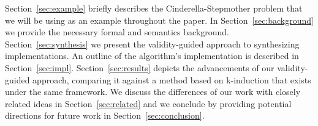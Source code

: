 Section~\ref{sec:example} briefly describes the Cinderella-Stepmother problem that we will be using as an example throughout the paper. In Section~\ref{sec:background} we provide the necessary formal and semantics background. Section~\ref{sec:synthesis} we present the validity-guided approach to synthesizing implementations. 
An outline of the algorithm's implementation is described in Section~\ref{sec:impl}. Section~\ref{sec:results} depicts the advancements of our validity-guided
approach, comparing it against a method based on k-induction that exists under the same framework. We discuss the differences of our work with closely related ideas in Section~\ref{sec:related} and we conclude by providing potential directions for future work in Section~\ref{sec:conclusion}.

	
